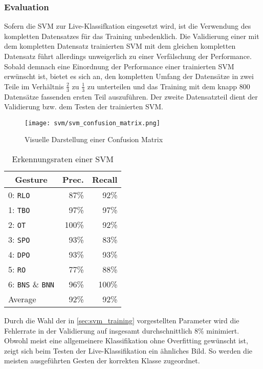 \subsubsection{Evaluation}\label{sec:svm_evaluation}
Sofern die \ac{SVM} zur Live-Klassifkation eingesetzt wird, ist die Verwendung des kompletten Datensatzes für das Training unbedenklich.
Die Validierung einer mit dem kompletten Datensatz trainierten \ac{SVM} mit dem gleichen kompletten Datensatz führt allerdings unweigerlich zu einer Verfälschung der Performance.
Sobald demnach eine Einordnung der Performance einer trainierten \ac{SVM} erwünscht ist, bietet es sich an, den kompletten Umfang der Datensätze in zwei Teile im Verhältnis $\frac{2}{3}$ zu $\frac{1}{3}$ zu unterteilen und das Training mit dem knapp 800 Datensätze fassenden ersten Teil auszuführen.
Der zweite Datensatzteil dient der Validierung bzw. dem Testen der trainierten \ac{SVM}.
\begin{figure}[htbp] \centering
    \texttt{[image: svm/svm\_confusion\_matrix.png]}
    \caption{Visuelle Darstellung einer Confusion Matrix}
    \label{fig:svm_confusion_matrix}
\end{figure}
\begin{table}[h]
\centering
\begin{tabular}{lrr}
\hline
 \multicolumn{1}{c}{\textbf{Gesture}} & \multicolumn{1}{c}{\textbf{Prec.}} & \multicolumn{1}{c}{\textbf{Recall}} \\
 \hline
  0: \texttt{\ac{RLO}} & 87\% & 92\% \\
 \hline
  1: \texttt{\ac{TBO}} & 97\% & 97\% \\
 \hline
  2: \texttt{\ac{OT}} & 100\% & 92\% \\
 \hline
  3: \texttt{\ac{SPO}} & 93\% & 83\% \\
 \hline
  4: \texttt{\ac{DPO}} & 93\% & 93\% \\
 \hline
  5: \texttt{\ac{RO}} & 77\% & 88\% \\
 \hline
  6: \texttt{\ac{BNS}} \& \texttt{\ac{BNN}} & 96\% & 100\% \\
 \hline
  Average & 92\% & 92\% \\
 \hline
\end{tabular}
\caption[Erkennungsraten einer SVM]{Erkennungsraten einer SVM}
\label{tab:svm_performance}
\end{table}
Durch die Wahl der in \autoref{sec:svm_training} vorgestellten Parameter wird die Fehlerrate in der Validierung auf insgesamt durchschnittlich 8\% minimiert.
Obwohl meist eine allgemeinere Klassifikation ohne Overfitting gewünscht ist, zeigt sich beim Testen der Live-Klassifikation ein ähnliches Bild.
So werden die meisten ausgeführten Gesten der korrekten Klasse zugeordnet.

